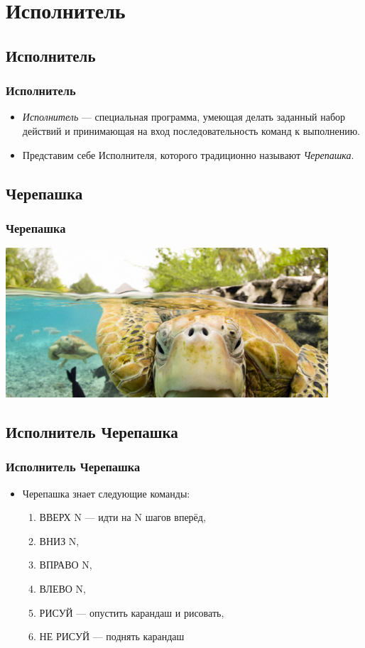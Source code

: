 \documentclass[compress,red]{beamer}
\begin{document}
\section{Исполнитель}

\subsection{Исполнитель}
\begin{frame}[fragile]
  \frametitle{Исполнитель}
  \begin{itemize}
    \item \emph{Исполнитель} --- специальная программа, умеющая делать заданный набор действий и принимающая на вход последовательность команд к выполнению.
    \item Представим себе Исполнителя, которого традиционно называют \emph{Черепашка}.
  \end{itemize}
\end{frame}

\subsection{Черепашка}
\begin{frame}[fragile]
  \frametitle{Черепашка}
  \centerline{\includegraphics[width=0.9\textwidth]{images/turtle.png}}
\end{frame}

\subsection{Исполнитель Черепашка}
\begin{frame}[fragile]
  \frametitle{Исполнитель Черепашка}
  \begin{itemize}
    \item Черепашка знает следующие команды:
        \begin{enumerate}
            \item ВВЕРХ N --- идти на N шагов вперёд,
            \item ВНИЗ N,
            \item ВПРАВО N,
            \item ВЛЕВО N,
            \item РИСУЙ --- опустить карандаш и рисовать,
            \item НЕ РИСУЙ --- поднять карандаш
        \end{enumerate}
  \end{itemize}
\end{frame}
\end{document}
